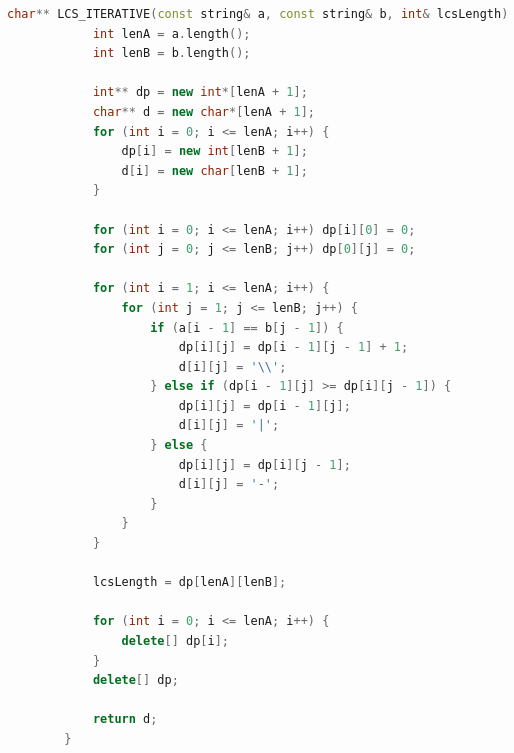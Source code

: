 \documentclass{article}
\theoremstyle{definition}
\begin{document}
	\begin{lstlisting}[language=C++, tabsize=3, caption={Implementacja LCS\_ITERATIVE}]
		char** LCS_ITERATIVE(const string& a, const string& b, int& lcsLength) {
			int lenA = a.length();
			int lenB = b.length();
			
			int** dp = new int*[lenA + 1];
			char** d = new char*[lenA + 1];
			for (int i = 0; i <= lenA; i++) {
				dp[i] = new int[lenB + 1];
				d[i] = new char[lenB + 1];
			}
			
			for (int i = 0; i <= lenA; i++) dp[i][0] = 0;
			for (int j = 0; j <= lenB; j++) dp[0][j] = 0;
			
			for (int i = 1; i <= lenA; i++) {
				for (int j = 1; j <= lenB; j++) {
					if (a[i - 1] == b[j - 1]) {
						dp[i][j] = dp[i - 1][j - 1] + 1;
						d[i][j] = '\\';
					} else if (dp[i - 1][j] >= dp[i][j - 1]) {
						dp[i][j] = dp[i - 1][j];
						d[i][j] = '|';
					} else {
						dp[i][j] = dp[i][j - 1];
						d[i][j] = '-';
					}
				}
			}
			
			lcsLength = dp[lenA][lenB];
			
			for (int i = 0; i <= lenA; i++) {
				delete[] dp[i];
			}
			delete[] dp;
			
			return d;
		}
	\end{lstlisting}
\end{document}

